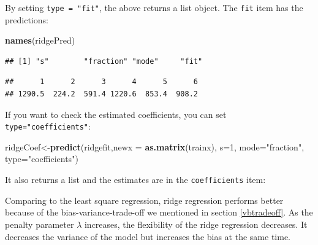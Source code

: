 \documentclass[12pt,]{krantz}
\makeatletter
\newenvironment{Shaded}{\begin{snugshade}}{\end{snugshade}}
\newcommand{\CommentTok}[1]{\textcolor[rgb]{0.37,0.37,0.37}{\textit{#1}}}
\newcommand{\DataTypeTok}[1]{\textcolor[rgb]{0.27,0.27,0.27}{#1}}
\newcommand{\DecValTok}[1]{\textcolor[rgb]{0.06,0.06,0.06}{#1}}
\newcommand{\KeywordTok}[1]{\textcolor[rgb]{0.27,0.27,0.27}{\textbf{#1}}}
\newcommand{\NormalTok}[1]{#1}
\newcommand{\OperatorTok}[1]{\textcolor[rgb]{0.43,0.43,0.43}{\textbf{#1}}}
\newcommand{\StringTok}[1]{\textcolor[rgb]{0.5,0.5,0.5}{#1}}
\newenvironment{kframe}{%
\medskip{}
\setlength{\fboxsep}{.8em}
 \def\at@end@of@kframe{}%
 \ifinner\ifhmode%
  \def\at@end@of@kframe{\end{minipage}}%
  \begin{minipage}{\columnwidth}%
 \fi\fi%
 \def\FrameCommand##1{\hskip\@totalleftmargin \hskip-\fboxsep
 \colorbox{shadecolor}{##1}\hskip-\fboxsep
     \hskip-\linewidth \hskip-\@totalleftmargin \hskip\columnwidth}%
 \MakeFramed {\advance\hsize-\width
   \@totalleftmargin\z@ \linewidth\hsize
   \@setminipage}}%
 {\par\unskip\endMakeFramed%
 \at@end@of@kframe}
\renewenvironment{Shaded}{\begin{kframe}}{\end{kframe}}
\makeatother
\begin{document}
By setting \texttt{type\ =\ "fit"}, the above returns a list object. The \texttt{fit} item has the predictions:

\begin{Shaded}
\begin{Highlighting}[]
\KeywordTok{names}\NormalTok{(ridgePred)}
\end{Highlighting}
\end{Shaded}

\begin{verbatim}
## [1] "s"        "fraction" "mode"     "fit"
\end{verbatim}

\begin{Shaded}
\end{Shaded}

\begin{verbatim}
##      1      2      3      4      5      6 
## 1290.5  224.2  591.4 1220.6  853.4  908.2
\end{verbatim}

If you want to check the estimated coefficients, you can set \texttt{type="coefficients"}:

\begin{Shaded}
\begin{Highlighting}[]
\NormalTok{ridgeCoef<-}\KeywordTok{predict}\NormalTok{(ridgefit,}\DataTypeTok{newx =} \KeywordTok{as.matrix}\NormalTok{(trainx), }
                   \DataTypeTok{s=}\DecValTok{1}\NormalTok{, }\DataTypeTok{mode=}\StringTok{"fraction"}\NormalTok{, }\DataTypeTok{type=}\StringTok{"coefficients"}\NormalTok{)}
\end{Highlighting}
\end{Shaded}

It also returns a list and the estimates are in the \texttt{coefficients} item:

\begin{Shaded}
\end{Shaded}

Comparing to the least square regression, ridge regression performs better because of the bias-variance-trade-off we mentioned in section \ref{vbtradeoff}. As the penalty parameter \(\lambda\) increases, the flexibility of the ridge regression decreases. It decreases the variance of the model but increases the bias at the same time.
\end{document}
